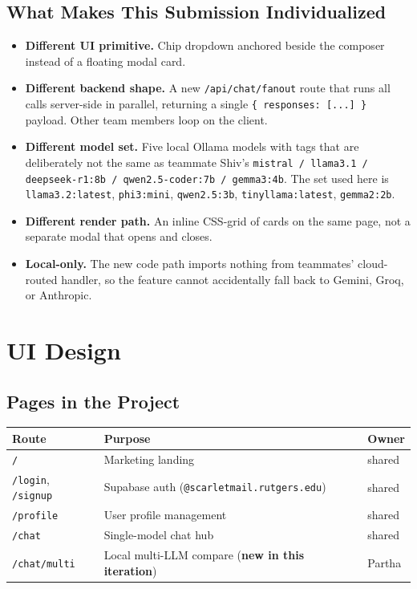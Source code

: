 \documentclass[11pt]{article}
\begin{document}
\subsection{What Makes This Submission Individualized}

\begin{itemize}[leftmargin=*]
  \item \textbf{Different UI primitive.} Chip dropdown anchored beside the
    composer instead of a floating modal card.
  \item \textbf{Different backend shape.} A new \texttt{/api/chat/fanout}
    route that runs all calls server-side in parallel, returning a single
    \texttt{\{ responses: [...] \}} payload. Other team members loop on
    the client.
  \item \textbf{Different model set.} Five local Ollama models with tags
    that are deliberately not the same as teammate Shiv's
    \texttt{mistral / llama3.1 / deepseek-r1:8b / qwen2.5-coder:7b /
    gemma3:4b}.  The set used here is
    \texttt{llama3.2:latest}, \texttt{phi3:mini},
    \texttt{qwen2.5:3b}, \texttt{tinyllama:latest},
    \texttt{gemma2:2b}.
  \item \textbf{Different render path.} An inline CSS-grid of cards on
    the same page, not a separate modal that opens and closes.
  \item \textbf{Local-only.} The new code path imports nothing from
    teammates' cloud-routed handler, so the feature cannot accidentally
    fall back to Gemini, Groq, or Anthropic.
\end{itemize}

\section{UI Design}

\subsection{Pages in the Project}

\begin{tabularx}{\textwidth}{lXl}
\toprule
\textbf{Route} & \textbf{Purpose} & \textbf{Owner} \\
\midrule
\texttt{/} & Marketing landing & shared \\
\texttt{/login}, \texttt{/signup} & Supabase auth (\texttt{@scarletmail.rutgers.edu}) & shared \\
\texttt{/profile} & User profile management & shared \\
\texttt{/chat} & Single-model chat hub & shared \\
\texttt{/chat/multi} & Local multi-LLM compare (\textbf{new in this iteration}) & Partha \\
\bottomrule
\end{tabularx}
\end{document}
